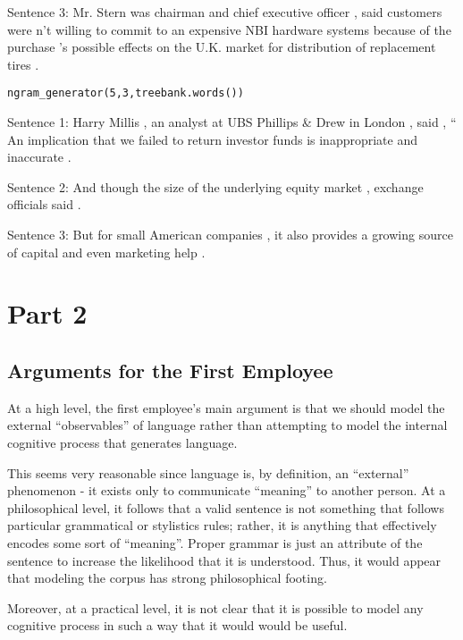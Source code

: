 \documentclass[11pt]{article}
\begin{document}
\begin{enumerate}
{Sentence 3:  Mr. Stern was chairman and chief executive officer , said customers were n't willing to commit to an expensive NBI hardware systems because of the purchase 's possible effects on the U.K. market for distribution of replacement tires . 
}

\tt{
\begin{verbatim}ngram_generator(5,3,treebank.words())\end{verbatim}

Sentence 1:  Harry Millis , an analyst at UBS Phillips \& Drew in London , said , 
`` An implication that we failed to return investor funds is inappropriate and 
inaccurate . 

Sentence 2:  And though the size of the underlying equity market , exchange officials said . 

Sentence 3:  But for small American companies , it also provides a growing source of capital and even marketing help .
}

\end{enumerate}

\newpage

\section*{Part 2}

\subsection* {Arguments for the First Employee}

At a high level, the first employee's main argument is that we should model the external ``observables'' of language rather than attempting to model the internal cognitive process that generates language.

This seems very reasonable since language is, by definition, an ``external'' phenomenon - it exists only to communicate ``meaning'' to another person. At a philosophical level, it follows that a valid sentence is not something that follows particular grammatical or stylistics rules; rather, it is anything that effectively encodes some sort of ``meaning''. Proper grammar is just an attribute of the sentence to increase the likelihood that it is understood. Thus, it would appear that modeling the corpus has strong philosophical footing.

Moreover, at a practical level, it is not clear that it is possible to model any cognitive process in such a way that it would would be useful. 
\end{document}
